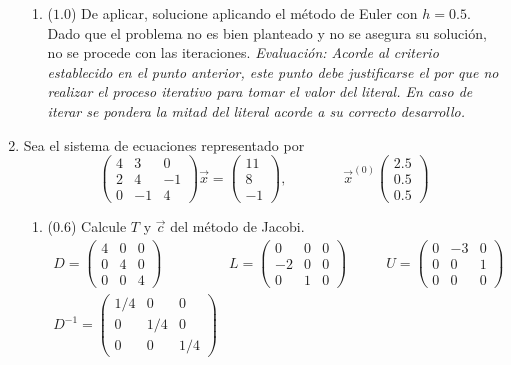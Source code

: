 \documentclass[12pt]{article}
\begin{document}
\begin{enumerate}[leftmargin=*,widest=9]
\begin{enumerate}[label=\alph*]
   \item (\( 1.0\)) De aplicar, solucione aplicando el método de Euler con \(h=0.5\).
   Dado que el problema no es bien planteado y no se asegura su solución, no se procede con las iteraciones.
   \textit{Evaluación: Acorde al criterio establecido en el punto anterior, este punto debe justificarse el por que no realizar el proceso iterativo para tomar el valor del literal. En caso de iterar se pondera la mitad del literal acorde a su correcto desarrollo.}
    \end{enumerate}
    \item Sea el sistema de ecuaciones representado por
    \[
    \begin{pmatrix}
    4 & 3 & 0 \\ 2 & 4 & -1\\ 0 & -1 & 4
    \end{pmatrix}\vec{x} = \begin{pmatrix}
    11 \\ 8\\ -1
    \end{pmatrix}, \qquad \qquad \vec{x}^{(0)}\begin{pmatrix}
    2.5 \\ 0.5\\ 0.5
    \end{pmatrix}
    \]
    \begin{enumerate}[label=\alph*]
    \item (\(0.6\)) Calcule \(T\) y \(\vec{c}\) del método de Jacobi.
    \begin{eqnarray*}
    D = \begin{pmatrix}
    4 & 0 & 0 \\ 0 & 4 & 0\\ 0 & 0 & 4
    \end{pmatrix} \qquad &
    L = \begin{pmatrix}
    0 & 0 & 0 \\ -2 & 0 & 0\\ 0 & 1 & 0
    \end{pmatrix} \qquad &
    U = \begin{pmatrix}
    0 & -3 & 0 \\ 0 & 0 & 1\\ 0 & 0 & 0
    \end{pmatrix} \\
    D^{-1} = \begin{pmatrix}
    1/4 & 0 & 0 \\ 0 & 1/4 & 0\\ 0 & 0 & 1/4

\end{pmatrix}
\end{eqnarray*}
\end{enumerate}
\end{enumerate}
\end{document}

